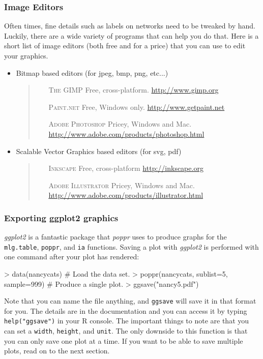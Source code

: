 \documentclass[letterpaper]{article}
\newcommand{\tab}{\hspace*{1em}}
\begin{document}
\subsubsection{Image Editors}\label{appendix:graphics:editors}
\tab\tab Often times, fine details such as labels on networks need to be tweaked by hand. Luckily, there are a wide variety of programs that can help you do that. Here is a short list of image editors (both free and for a price) that you can use to edit your graphics.
\begin{itemize}
  \item Bitmap based editors (for jpeg, bmp, png, etc...)
  \begin{quote}
  \begin{itemize}
    \item[ \scshape The GIMP ] Free, cross-platform. \url{http://www.gimp.org}
    \item[ \scshape Paint.net ] Free, Windows only. \url{http://www.getpaint.net}
    \item[ \scshape Adobe Photoshop ] Pricey, Windows and Mac. \url{http://www.adobe.com/products/photoshop.html}
  \end{itemize}
  \end{quote}
  \item Scalable Vector Graphics based editors (for svg, pdf)
  \begin{quote}
  \begin{itemize}
    \item[ \scshape Inkscape ] Free, cross-platform \url{http://inkscape.org}
    \item[ \scshape Adobe Illustrator ] Pricey, Windows and Mac. \url{http://www.adobe.com/products/illustrator.html}
  \end{itemize}
  \end{quote}
\end{itemize}

\subsubsection{Exporting ggplot2 graphics}\label{appendix:graphics:ggplot2}
\tab\tab \textit{ggplot2} is a fantastic package that \textit{poppr} uses to produce graphs for the \texttt{mlg.table}, \texttt{poppr}, and \texttt{ia} functions. Saving a plot with \textit{ggplot2} is performed with one command after your plot has rendered:
\begin{Schunk}
\begin{Sinput}
> data(nancycats) # Load the data set.
> poppr(nancycats, sublist=5, sample=999) # Produce a single plot.
> ggsave("nancy5.pdf")
\end{Sinput}
\end{Schunk}
Note that you can name the file anything, and \texttt{ggsave} will save it in that format for you. The details are in the documentation and you can access it by typing \texttt{help("ggsave")} in your R console. The important things to note are that you can set a \texttt{width}, \texttt{height}, and \texttt{unit}. The only downside to this function is that you can only save one plot at a time. If you want to be able to save multiple plots, read on to the next section.
\end{document}
